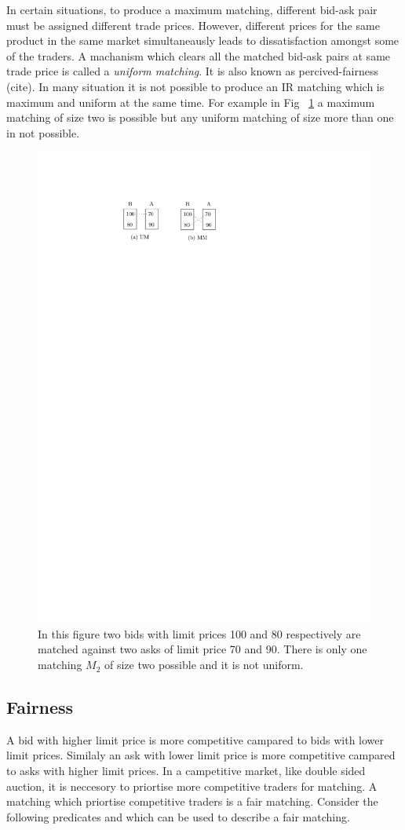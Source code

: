 \documentclass[a4paper,UKenglish,cleveref, autoref]{lipics-v2019}
\begin{document}
In certain situations, to produce a maximum matching, different bid-ask pair must be assigned different trade prices. However, different prices for the same product in the same market simultaneausly leads to dissatisfaction amongst some of the traders. A machanism which clears all the matched bid-ask pairs at same trade price is called a \emph{uniform matching}. It is also known as percived-fairness (cite). In many situation it is not possible to produce an IR matching which is maximum and uniform at the same time. For example in Fig ~\ref{fig:mmum} a maximum matching of size two is possible but any uniform matching of size more than one in not possible. 


\begin{figure}[h!]
\centering
\includegraphics[width=.5\textwidth]{mm_um.pdf}
\caption{In this figure two bids with limit prices 100 and 80 respectively are matched against two asks of limit price 70 and 90. There is only one matching $M_2$ of size two possible and it is not uniform.}
\label{fig:mmum}
\end{figure}


\subsection{Fairness}  

A bid with higher limit price is more competitive campared to bids with lower limit prices. Similaly an ask with lower limit price is more competitive campared to asks with higher limit prices. In a campetitive market, like double sided auction, it is neccesory to priortise more competitive traders for matching. A matching which priortise competitive traders is a fair matching. Consider the following predicates  and   which can be used to describe a fair matching. 
\end{document}
